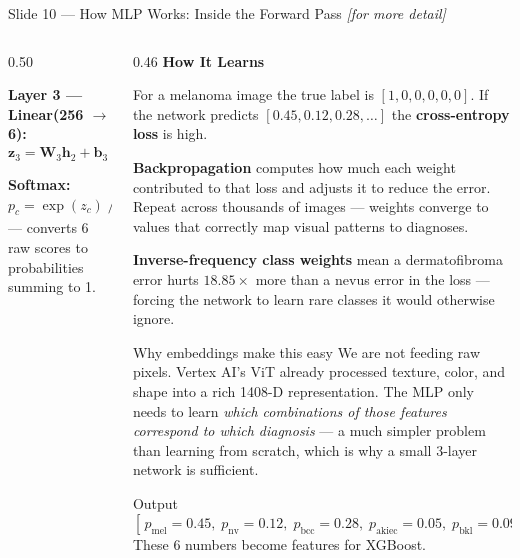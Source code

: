 \documentclass[aspectratio=169, 9pt]{beamer}
\begin{document}
\begin{frame}{Slide 10 --- How MLP Works: Inside the Forward Pass \hfill{\small\textit{[for more detail]}}}
\begin{columns}[T]
\begin{column}{0.50\textwidth}
{      \vspace{0.2em}
      \textbf{Layer 3 --- Linear(256 $\to$ 6):}
      \[ \mathbf{z}_3 = \mathbf{W}_3 \mathbf{h}_2 + \mathbf{b}_3 \quad \in \mathbb{R}^{6} \]

      \vspace{0.1em}
      \textbf{Softmax:}
      $p_c = \exp(z_c) \;/\; \textstyle\sum_j \exp(z_j)$
      --- converts 6 raw scores to probabilities summing to 1.
      }
    \end{column}

    \begin{column}{0.46\textwidth}
      \textbf{\color{navyblue}How It Learns}

      \vspace{0.2em}
      {\scriptsize
      For a melanoma image the true label is $[1,0,0,0,0,0]$.
      If the network predicts $[0.45, 0.12, 0.28, \ldots]$ the
      \textbf{cross-entropy loss} is high.

      \vspace{0.2em}
      \textbf{Backpropagation} computes how much each weight
      contributed to that loss and adjusts it to reduce the error.
      Repeat across thousands of images --- weights converge to
      values that correctly map visual patterns to diagnoses.

      \vspace{0.2em}
      \textbf{Inverse-frequency class weights} mean a dermatofibroma
      error hurts $18.85\times$ more than a nevus error in the loss
      --- forcing the network to learn rare classes it would otherwise
      ignore.
      }

      \vspace{0.3em}
      \begin{exampleblock}{Why embeddings make this easy}
        \scriptsize
        We are not feeding raw pixels. Vertex AI's ViT already
        processed texture, color, and shape into a rich
        1408-D representation. The MLP only needs to learn
        \textit{which combinations of those features correspond
        to which diagnosis} --- a much simpler problem than
        learning from scratch, which is why a small 3-layer
        network is sufficient.
      \end{exampleblock}

      \vspace{0.3em}
      \begin{block}{Output}
        \scriptsize
        $[\,p_{\text{mel}}=0.45,\; p_{\text{nv}}=0.12,\;
        p_{\text{bcc}}=0.28,\; p_{\text{akiec}}=0.05,\;
        p_{\text{bkl}}=0.09,\; p_{\text{df}}=0.01\,]$\\
        These 6 numbers become features for XGBoost.
      \end{block}
    \end{column}

  \end{columns}
\end{frame}
\end{document}

